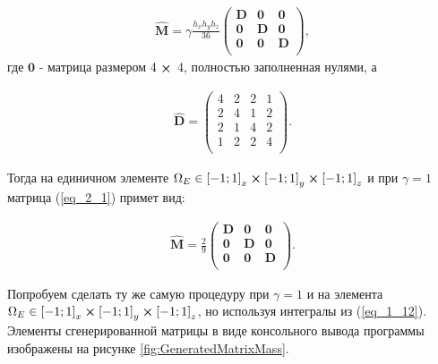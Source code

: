 \begin{equation} \label{eq_2_1}
	\begin{gathered}
		\hat{\textbf{M}} = \gamma \frac{h_x h_y h_z}{36} 
		\begin{pmatrix} 
			\textbf{D} & \textbf{0} & \textbf{0}\\
			\textbf{0} & \textbf{D} & \textbf{0}\\
			\textbf{0} & \textbf{0} & \textbf{D}\\
		\end{pmatrix},
	\end{gathered}
\end{equation}
где $\textbf{0}$ - матрица размером 4 $\cross$ 4, полностью заполненная нулями, а

\begin{equation*}
	\begin{gathered}
		\hat{\textbf{D}} =
		\begin{pmatrix}
			4 & 2 & 2 & 1\\
			2 & 4 & 1 & 2\\
			2 & 1 & 4 & 2\\
			1 & 2 & 2 & 4\\
		\end{pmatrix}.
	\end{gathered}
\end{equation*}

Тогда на единичном элементе $\Omega_E \in \left[-1; 1\right]_x \cross \left[-1; 1\right]_y \cross \left[-1; 1\right]_z$ и при $\gamma = 1$ матрица (\ref{eq_2_1}) примет вид:


\begin{equation*}
	\begin{gathered}
		\hat{\textbf{M}} = \frac{2}{9} 
		\begin{pmatrix} 
			\textbf{D} & \textbf{0} & \textbf{0}\\
			\textbf{0} & \textbf{D} & \textbf{0}\\
			\textbf{0} & \textbf{0} & \textbf{D}\\
		\end{pmatrix}.
	\end{gathered}
\end{equation*}

Попробуем сделать ту же самую процедуру при $\gamma = 1$ и на элемента $\Omega_E \in \left[-1; 1\right]_x \cross \left[-1; 1\right]_y \cross \left[-1; 1\right]_z$, но используя интегралы из (\ref{eq_1_12}). Элементы сгенерированной матрицы в виде консольного вывода программы изображены на рисунке \ref{fig:GeneratedMatrixMass}.

